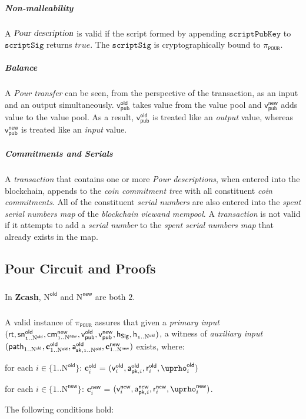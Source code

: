 \documentclass[8pt]{article}
\newcommand{\term}[1]{\textsl{#1}\xspace}
\newcommand{\termbf}[1]{\textbf{#1}\xspace}
\newcommand{\Zcash}{\termbf{Zcash}}
\newcommand{\coinCommitments}{\term{coin commitments}}
\newcommand{\coinCommitmentTree}{\term{coin commitment tree}}
\newcommand{\PourDescription}{\term{Pour description}}
\newcommand{\PourDescriptions}{\term{Pour descriptions}}
\newcommand{\PourTransfer}{\term{Pour transfer}}
\newcommand{\transaction}{\term{transaction}}
\newcommand{\blockchainview}{\term{blockchain view}}
\newcommand{\mempool}{\term{mempool}}
\newcommand{\serialNumber}{\term{serial number}}
\newcommand{\serialNumbers}{\term{serial numbers}}
\newcommand{\spentSerialsMap}{\term{spent serial numbers map}}
\newcommand{\SpendAuthorityPublicOld}[1]{\mathsf{a^{old}_{pk,\mathnormal{#1}}}}
\newcommand{\SpendAuthorityPrivateOld}[1]{\mathsf{a^{old}_{sk,\mathnormal{#1}}}}
\newcommand{\SpendAuthorityPublicNew}[1]{\mathsf{a^{new}_{pk,\mathnormal{#1}}}}
\newcommand{\CoinCommitRandOld}[1]{\mathsf{r^{old}_\mathnormal{#1}}}
\newcommand{\CoinCommitRandNew}[1]{\mathsf{r^{new}_\mathnormal{#1}}}
\newcommand{\CoinAddressRandOld}[1]{\mathsf{\uprho^{old}_\mathnormal{#1}}}
\newcommand{\CoinAddressRandNew}[1]{\mathsf{\uprho^{new}_\mathnormal{#1}}}
\newcommand{\cmNew}[1]{\mathsf{{cm}^{new}_\mathnormal{#1}}}
\newcommand{\snOld}[1]{\mathsf{{sn}^{old}_\mathnormal{#1}}}
\newcommand{\scriptSig}{\mathtt{scriptSig}}
\newcommand{\scriptPubKey}{\mathtt{scriptPubKey}}
\newcommand{\rt}{\mathsf{rt}}
\newcommand{\hSig}{\mathsf{h_{Sig}}}
\newcommand{\h}[1]{\mathsf{h_{\mathnormal{#1}}}}
\newcommand{\NOld}{\mathrm{N}^\mathsf{old}}
\newcommand{\NNew}{\mathrm{N}^\mathsf{new}}
\newcommand{\PourStatement}{\texttt{POUR}}
\newcommand{\PourProof}{\pi_{\PourStatement}}
\newcommand{\vpubOld}{\mathsf{v_{pub}^{old}}}
\newcommand{\vpubNew}{\mathsf{v_{pub}^{new}}}
\newcommand{\cOld}[1]{\mathbf{c}_{#1}^\mathsf{old}}
\newcommand{\cNew}[1]{\mathbf{c}_{#1}^\mathsf{new}}
\newcommand{\vOld}[1]{\mathsf{v}_{#1}^\mathsf{old}}
\newcommand{\vNew}[1]{\mathsf{v}_{#1}^\mathsf{new}}
\newcommand{\treepath}[1]{\mathsf{path}_{#1}}
\begin{document}
\subparagraph{Non-malleability}

A $\PourDescription$ is valid if the script formed by appending $\scriptPubKey$ to 
$\scriptSig$ returns $true$. The $\scriptSig$ is cryptographically bound to 
$\PourProof$.

\subparagraph{Balance}

A \PourTransfer can be seen, from the perspective of the transaction, as an 
input and an output simultaneously. $\vpubOld$ takes value from the value pool and 
$\vpubNew$ adds value to the value pool. As a result, $\vpubOld$ is treated like an 
\emph{output} value, whereas $\vpubNew$ is treated like an \emph{input} value.

\subparagraph{Commitments and Serials}

A \transaction that contains one or more \PourDescriptions, when entered into the 
blockchain, appends to the \coinCommitmentTree with all constituent 
\coinCommitments. All of the constituent \serialNumbers are also entered into the 
\spentSerialsMap of the \blockchainview \emph{and} \mempool. A \transaction is not 
valid if it attempts to add a \serialNumber to the \spentSerialsMap that already 
exists in the map.

\subsection{Pour Circuit and Proofs}

\subparagraph{}

In \Zcash, $\NOld$ and $\NNew$ are both $2$.

\subparagraph{}

A valid instance of $\PourProof$ assures that given a \term{primary input}
$(\rt, \snOld{1..\NOld}, \cmNew{1..\NNew}, \vpubOld, \vpubNew, \hSig, \h{1..\NOld})$,
a witness of \term{auxiliary input}
$(\treepath{1..\NOld}, \cOld{1..\NOld}, \SpendAuthorityPrivateOld{1..\NOld}, \cNew{1..\NNew})$
exists, where:

\begin{list}{}{}

\item for each $i \in \{1..\NOld\}$: $\cOld{i}$ = $(\vOld{i}, 
\SpendAuthorityPublicOld{i}, \CoinCommitRandOld{i}, \CoinAddressRandOld{i})$

\item for each $i \in \{1..\NNew\}$: $\cNew{i}$ = $(\vNew{i}, 
\SpendAuthorityPublicNew{i}, \CoinCommitRandNew{i}, \CoinAddressRandNew{i})$.

\item The following conditions hold:

\end{list}
\end{document}
